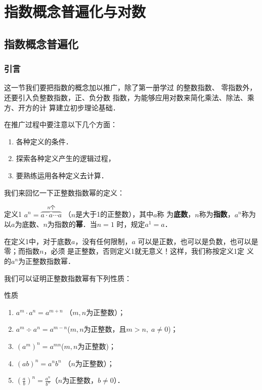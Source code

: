 \chapter{指数概念普遍化与对数}

\section{指数概念普遍化}
\subsection{引言}
这一节我们要把指数的概念加以推广，除了第一册学过
的整数指数、
零指数外，还要引入负整数指数，正、负分数
指数，为能够应用对数来简化乘法、除法、乘方、开方的计
算建立初步理论基础．

在推广过程中要注意以下几个方面：
\begin{enumerate}
\item 各种定义的条件．
\item 探索各种定义产生的逻辑过程，
\item 要熟练运用各种定义去计算．
\end{enumerate}


我们来回忆一下正整数指数幂的定义：

\begin{blk}{定义1}
$a^n=\overbrace{a\cdot a\cdots a}^{\text{$n$个}}$ （$n$是大于1的正整数），其中$a$称
为\textbf{底数}，$n$称为\textbf{指数}，$a^n$称为以$a$为底数、$n$为指数的\textbf{幂}．当$n=1$
时，规定$a^1=a$．
\end{blk}

在定义1中，对于底数$a$，没有任何限制，$a$
可以是正数，也可以是负数，也可以是零；而指数$n$，必须
是正整数，否则定义1就无意义！这样，我们称按定义1定
义的$a^n$为正整数指数幂．

我们可以证明正整数指数幂有下列性质：
\begin{blk}{性质}
\begin{enumerate}
    \item $a^m\cdot a^n=a^{m+n}$ \quad （$m,n$为正整数）；
    \item $a^m\div a^n=a^{m-n}$\quad ($m,n$为正整数，且$m>n,\; a\ne 0$)；
    \item $(a^m)^n=a^{mn}$\quad ($m,n$为正整数)；
    \item $(ab)^n=a^nb^n$ \quad（$n$为正整数）；
    \item $\left(\frac{a}{b}\right)^n=\frac{a^n}{b^n}$\quad （$n$为正整数，$b\ne 0$）．
\end{enumerate}
\end{blk}

